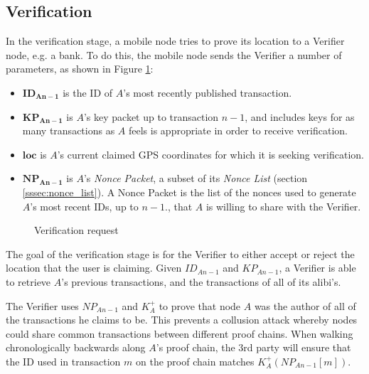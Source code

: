 \subsection{Verification} \label{ssec:verification}
\begin{minipage}{0.5\linewidth}
In the verification stage, a mobile node tries to prove its location to a Verifier node, e.g. a bank. To do this, the mobile node sends the Verifier a number of parameters, as shown in Figure \ref{fig:verify_request}:
\begin{itemize}[noitemsep,topsep=0pt]
	\item[] $\mathbf{ID_{An-1}}$ is the ID of $A$'s most recently published transaction.
	\item[] $\mathbf{KP_{An-1}}$ is $A$'s key packet up to transaction $n-1$, and includes keys for as many transactions as $A$ feels is appropriate in order to receive verification.
	\item[] $\mathbf{loc}$ is $A$'s current claimed GPS coordinates for which it is seeking verification.
	\item[] $\mathbf{NP_{An-1}}$ is $A$'s \textit{Nonce Packet}, a subset of its \textit{Nonce List} (section \ref{sssec:nonce_list}). A Nonce Packet is the list of the nonces used to generate $A$'s most recent IDs, up to $n-1$., that $A$ is willing to share with the Verifier. 
\end{itemize}
\end{minipage}
\hfill
\begin{minipage}[c]{0.5\linewidth}
\begin{figure}[H]

\caption{Verification request}
\label{fig:verify_request}
\end{figure}
\end{minipage}

The goal of the verification stage is for the Verifier to either accept or reject the location that the user is claiming. Given $ID_{An-1}$ and $KP_{An-1}$, a Verifier is able to retrieve $A$'s previous transactions, and the transactions of all of its alibi's.

The Verifier uses $NP_{An-1}$ and $K^{+}_A$ to prove that node $A$ was the author of all of the transactions he claims to be. This prevents a collusion attack whereby nodes could share common transactions between different proof chains. When walking chronologically backwards along $A$'s proof chain, the 3rd party will ensure that the ID used in transaction $m$ on the proof chain matches $K^{+}_A(NP_{An-1}[m])$.


